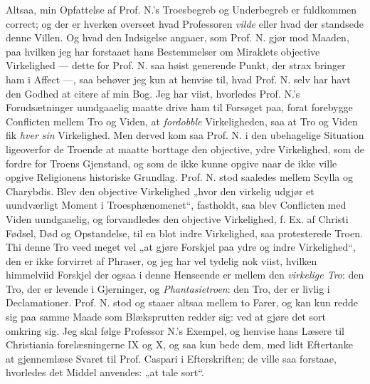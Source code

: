 \documentclass[12pt,a4paper]{book}
\newcommand{\opage}[1]{\marginnote{\footnotesize\textit{[#1]}}}
\begin{document}
Altsaa, min Opfattelse af Prof. N.'s Troesbegreb og Underbegreb er fuldkommen
correct; og der er hverken overseet hvad Professoren \emph{vilde} eller hvad der
standsede denne Villen. Og hvad den Indsigelse angaaer, som Prof. N. gjør mod
Maaden, paa hvilken jeg har forstaaet hans Bestemmelser om Miraklets objective
Virkelighed --- dette for Prof. N. saa høist generende Punkt, der strax bringer
ham i Affect ---, saa behøver jeg kun at henvise til, hvad Prof. N. selv har
havt den Godhed at citere af min Bog. Jeg har viist, hvorledes Prof. N.'s
Forudsætninger uundgaaelig maatte drive ham til Forsøget paa, forat forebygge
Conflicten mellem Tro og Viden, at \emph{fordobble} Virkeligheden, saa at Tro og
Viden fik \emph{hver sin} Virkelighed. Men derved kom saa Prof. N. i den
ubehagelige Situation ligeoverfor de Troende at maatte borttage den objective,
ydre Virkelighed, som de fordre for Troens Gjenstand, og som de ikke kunne
opgive naar de ikke ville opgive Religionens historiske Grundlag. Prof. N. stod
saaledes mellem Scylla og Charybdis. Blev den objective Virkelighed „hvor den
virkelig udgjør et uundværligt Moment i Troesphænomenet“, fastholdt, saa blev
Conflicten med Viden uundgaaelig, og forvandledes den objective Virkelighed,
f. Ex. af Christi Fødsel, Død og Opstandelse, til en blot indre Virkelighed, saa
protesterede Troen. Thi denne Tro veed meget vel „at gjøre Forskjel paa ydre og
indre Virkelighed“, den er ikke forvirret af Phraser, og jeg har vel tydelig nok
viist, hvilken himmelviid Forskjel der ogsaa i denne Henseende er mellem den
\emph{virkelige Tro}: den Tro, der er levende i Gjerninger, og
\emph{Phantasietroen}: den Tro, der er livlig i Declamationer. Prof. N. stod og
staaer altsaa mellem to Farer, og kan kun redde sig paa samme Maade som
Blæksprutten redder sig: ved at gjøre det sort omkring sig. Jeg skal følge
Professor N.'s Exempel, og henvise hans Læsere til Christiania\-%
\opage{8}%
forelæsningerne IX og X, og saa kun bede dem, med lidt Eftertanke at gjennemlæse
Svaret til Prof. Caspari i Efterskriften; de ville saa forstaae, hvorledes det
Middel anvendes: „at tale sort“.
\end{document}
